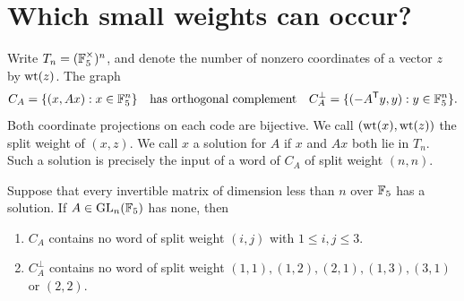 \section{Which small weights can occur?}
\label{sec:support}
Write $T_n=(\mathbb F_5^\times)^n$, and denote the number of nonzero coordinates of a vector $z$ by $\operatorname{wt}(z)$. The graph
\[
 C_A=\{(x,Ax):x\in\mathbb F_5^n\}
 \quad\text{has orthogonal complement}\quad
 C_A^\perp=\{(-A^{\mathsf T}y,y):y\in\mathbb F_5^n\}.
\]
Both coordinate projections on each code are bijective. We call $(\operatorname{wt}(x),\operatorname{wt}(z))$ the split weight of $(x,z)$. We call $x$ a solution for $A$ if $x$ and $Ax$ both lie in $T_n$. Such a solution is precisely the input of a word of $C_A$ of split weight $(n,n)$.

\begin{lemma}\label{lem:support}
Suppose that every invertible matrix of dimension less than $n$ over $\mathbb F_5$ has a solution. If $A\in\operatorname{GL}_n(\mathbb F_5)$ has none, then
\begin{enumerate}
\item $C_A$ contains no word of split weight $(i,j)$ with $1\le i,j\le3$.
\item $C_A^\perp$ contains no word of split weight $(1,1),(1,2),(2,1),(1,3),(3,1)$ or $(2,2)$.
\end{enumerate}
\end{lemma}

